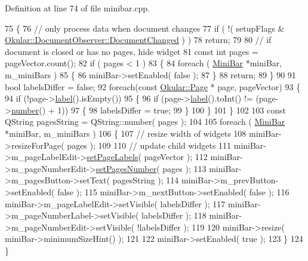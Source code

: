 Definition at line 74 of file minibar.\+cpp.


\begin{DoxyCode}
75 \{
76     \textcolor{comment}{// only process data when document changes}
77     \textcolor{keywordflow}{if} ( !( setupFlags & \hyperlink{classOkular_1_1DocumentObserver_aba00584af99894f95a9650e91f109d40ae599564392c01b22e96eff7602c4dd03}{Okular::DocumentObserver::DocumentChanged}
       ) )
78         \textcolor{keywordflow}{return};
79 
80     \textcolor{comment}{// if document is closed or has no pages, hide widget}
81     \textcolor{keyword}{const} \textcolor{keywordtype}{int} pages = pageVector.count();
82     \textcolor{keywordflow}{if} ( pages < 1 )
83     \{
84         \textcolor{keywordflow}{foreach} ( \hyperlink{classMiniBar}{MiniBar} *miniBar, m\_miniBars )
85         \{
86             miniBar->setEnabled( \textcolor{keyword}{false} );
87         \}
88         \textcolor{keywordflow}{return};
89     \}
90     
91     \textcolor{keywordtype}{bool} labelsDiffer = \textcolor{keyword}{false};
92     \textcolor{keywordflow}{foreach}(\textcolor{keyword}{const} \hyperlink{classOkular_1_1Page}{Okular::Page} * page, pageVector)
93     \{
94         \textcolor{keywordflow}{if} (!page->\hyperlink{classOkular_1_1Page_ae5cf0e5d2270c6add98bc4d9604e0e65}{label}().isEmpty())
95         \{
96             \textcolor{keywordflow}{if} (page->\hyperlink{classOkular_1_1Page_ae5cf0e5d2270c6add98bc4d9604e0e65}{label}().toInt() != (page->\hyperlink{classOkular_1_1Page_a6eee5f157a130b47d81ddd63e501664b}{number}() + 1))
97             \{
98                 labelsDiffer = \textcolor{keyword}{true};
99             \}
100         \}
101     \}
102     
103     \textcolor{keyword}{const} QString pagesString = QString::number( pages );
104 
105     \textcolor{keywordflow}{foreach} ( \hyperlink{classMiniBar}{MiniBar} *miniBar, m\_miniBars )
106     \{
107         \textcolor{comment}{// resize width of widgets}
108         miniBar->resizeForPage( pages );
109             
110         \textcolor{comment}{// update child widgets}
111         miniBar->m\_pageLabelEdit->\hyperlink{classPageLabelEdit_a98491407e83f10e7a2b7bec9051d36c1}{setPageLabels}( pageVector );
112         miniBar->m\_pageNumberEdit->\hyperlink{classPageNumberEdit_a844debe272a0cc761736185203c19b59}{setPagesNumber}( pages );
113         miniBar->m\_pagesButton->setText( pagesString );
114         miniBar->m\_prevButton->setEnabled( \textcolor{keyword}{false} );
115         miniBar->m\_nextButton->setEnabled( \textcolor{keyword}{false} );
116         miniBar->m\_pageLabelEdit->setVisible( labelsDiffer );
117         miniBar->m\_pageNumberLabel->setVisible( labelsDiffer );
118         miniBar->m\_pageNumberEdit->setVisible( !labelsDiffer );
119 
120         miniBar->resize( miniBar->minimumSizeHint() );
121 
122         miniBar->setEnabled( \textcolor{keyword}{true} );
123     \}
124 \}
\end{DoxyCode}
